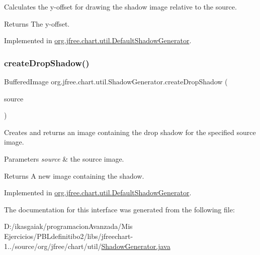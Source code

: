 Calculates the y-\/offset for drawing the shadow image relative to the source.

\begin{DoxyReturn}{Returns}
The y-\/offset. 
\end{DoxyReturn}


Implemented in \mbox{\hyperlink{classorg_1_1jfree_1_1chart_1_1util_1_1_default_shadow_generator_ae526cdf627474b32814f887b140609cf}{org.\+jfree.\+chart.\+util.\+Default\+Shadow\+Generator}}.

\mbox{\label{interfaceorg_1_1jfree_1_1chart_1_1util_1_1_shadow_generator_a8771623b832045a88620c5c5965d82eb}} 
\subsubsection{\texorpdfstring{create\+Drop\+Shadow()}{createDropShadow()}}
{\footnotesize\ttfamily Buffered\+Image org.\+jfree.\+chart.\+util.\+Shadow\+Generator.\+create\+Drop\+Shadow (\begin{DoxyParamCaption}\item[{Buffered\+Image}]{source }\end{DoxyParamCaption})}

Creates and returns an image containing the drop shadow for the specified source image.


\begin{DoxyParams}{Parameters}
{\em source} & the source image.\\
\hline
\end{DoxyParams}
\begin{DoxyReturn}{Returns}
A new image containing the shadow. 
\end{DoxyReturn}


Implemented in \mbox{\hyperlink{classorg_1_1jfree_1_1chart_1_1util_1_1_default_shadow_generator_a5ecdea4578e1625dc9b059108c6c82b6}{org.\+jfree.\+chart.\+util.\+Default\+Shadow\+Generator}}.



The documentation for this interface was generated from the following file\+:\begin{DoxyCompactItemize}
\item 
D\+:/ikasgaiak/programacion\+Avanzada/\+Mis Ejercicios/\+P\+B\+Ldefinitibo2/libs/jfreechart-\/1../source/org/jfree/chart/util/\mbox{\hyperlink{_shadow_generator_8java}{Shadow\+Generator.\+java}}\end{DoxyCompactItemize}
